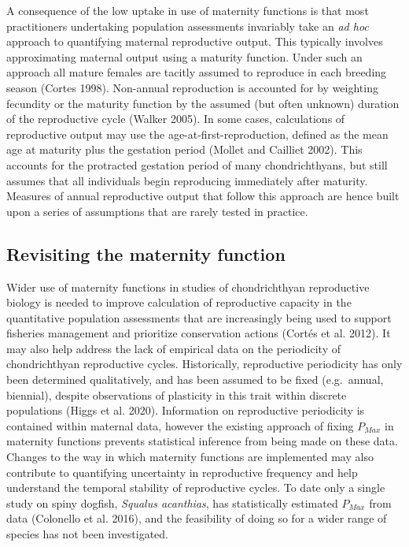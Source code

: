 \documentclass[
]{article}
\begin{document}
A consequence of the low uptake in use of maternity functions is that most practitioners undertaking population assessments invariably take an \emph{ad hoc} approach to quantifying maternal reproductive output. This typically involves approximating maternal output using a maturity function. Under such an approach all mature females are tacitly assumed to reproduce in each breeding season (Cortes 1998). Non-annual reproduction is accounted for by weighting fecundity or the maturity function by the assumed (but often unknown) duration of the reproductive cycle (Walker 2005). In some cases, calculations of reproductive output may use the age-at-first-reproduction, defined as the mean age at maturity plus the gestation period (Mollet and Cailliet 2002). This accounts for the protracted gestation period of many chondrichthyans, but still assumes that all individuals begin reproducing immediately after maturity. Measures of annual reproductive output that follow this approach are hence built upon a series of assumptions that are rarely tested in practice.

\subsection{Revisiting the maternity function}\label{revisiting-the-maternity-function}

Wider use of maternity functions in studies of chondrichthyan reproductive biology is needed to improve calculation of reproductive capacity in the quantitative population assessments that are increasingly being used to support fisheries management and prioritize conservation actions (Cortés et al. 2012). It may also help address the lack of empirical data on the periodicity of chondrichthyan reproductive cycles. Historically, reproductive periodicity has only been determined qualitatively, and has been assumed to be fixed (e.g.~annual, biennial), despite observations of plasticity in this trait within discrete populations (Higgs et al. 2020). Information on reproductive periodicity is contained within maternal data, however the existing approach of fixing \(P_{Max}\) in maternity functions prevents statistical inference from being made on these data. Changes to the way in which maternity functions are implemented may also contribute to quantifying uncertainty in reproductive frequency and help understand the temporal stability of reproductive cycles. To date only a single study on spiny dogfish, \emph{Squalus acanthias}, has statistically estimated \(P_{Max}\) from data (Colonello et al. 2016), and the feasibility of doing so for a wider range of species has not been investigated.
\end{document}
